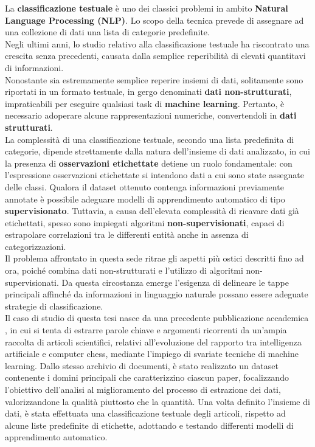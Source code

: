 La \textbf{classificazione testuale} è uno dei classici problemi in ambito \textbf{Natural Language Processing (NLP)}. Lo scopo della tecnica prevede di assegnare ad una collezione di dati una lista di categorie predefinite. \vspace*{7pt} \\
Negli ultimi anni, lo studio relativo alla classificazione testuale ha riscontrato una crescita senza precedenti, causata dalla semplice reperibilità di elevati quantitavi di informazioni. \vspace*{7pt} \\
Nonostante sia estremamente semplice reperire insiemi di dati, solitamente sono riportati in un formato testuale, in gergo denominati \textbf{dati non-strutturati}, impraticabili per eseguire qualsiasi task di \textbf{machine learning}. Pertanto, è necessario adoperare alcune rappresentazioni numeriche, convertendoli in \textbf{dati strutturati}. \vspace*{7pt} \\
La complessità di una classificazione testuale, secondo una lista predefinita di categorie, dipende strettamente dalla natura dell'insieme di dati analizzato, in cui la presenza di \textbf{osservazioni etichettate} detiene un ruolo fondamentale: con l'espressione osservazioni etichettate si intendono dati a cui sono state assegnate delle classi. Qualora il dataset ottenuto contenga informazioni previamente annotate è possibile adeguare modelli di apprendimento automatico di tipo \textbf{supervisionato}. Tuttavia, a causa dell'elevata complessità di ricavare dati già etichettati, spesso sono impiegati algoritmi \textbf{non-supervisionati}, capaci di estrapolare correlazioni tra le differenti entità anche in assenza di categorizzazioni. \vspace*{7pt} \\
Il problema affrontato in questa sede ritrae gli aspetti più ostici descritti fino ad ora, poiché combina dati non-strutturati e l'utilizzo di algoritmi non-supervisionati. Da questa circostanza emerge l'esigenza di delineare le tappe principali affinché da informazioni in linguaggio naturale possano essere adeguate strategie di classificazione. \vspace*{7pt} \\
Il caso di studio di questa tesi nasce da una precedente pubblicazione accademica \cite{Borghesi_2024}, in cui si tenta di estrarre parole chiave e argomenti ricorrenti da un'ampia raccolta di articoli scientifici, relativi all'evoluzione del rapporto tra intelligenza artificiale e computer chess, mediante l'impiego di svariate tecniche di machine learning. Dallo stesso archivio di documenti, è stato realizzato un dataset contenente i domini principali che caratterizzino ciascun paper, focalizzando l'obiettivo dell'analisi al miglioramento del processo di estrazione dei dati, valorizzandone la qualità piuttosto che la quantità. Una volta definito l'insieme di dati, è stata effettuata una classificazione testuale degli articoli, rispetto ad alcune liste predefinite di etichette, adottando e testando differenti modelli di apprendimento automatico.